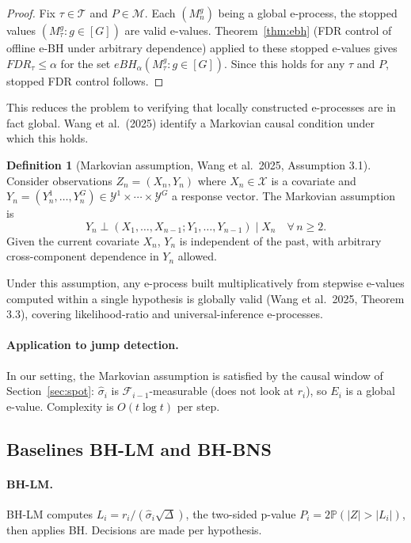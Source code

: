 \documentclass[11pt,a4paper,twocolumn]{article}
\theoremstyle{plain}
\theoremstyle{definition}
\newtheorem{definition}[theorem]{Definition}
\theoremstyle{remark}
\newcommand{\Prob}{\mathbb{P}}
\newcommand{\dt}{\Delta}
\begin{document}
\begin{proof}
Fix $\tau \in \mathcal{T}$ and $P \in \mathcal{M}$. Each $(M_n^g)$ being a
global e-process, the stopped values $(M_\tau^g : g \in [G])$ are valid
e-values. Theorem~\ref{thm:ebh} (FDR control of offline e-BH under arbitrary
dependence) applied to these stopped e-values gives $FDR_\tau \leq \alpha$
for the set $eBH_\alpha(M_\tau^g : g \in [G])$. Since this holds for any
$\tau$ and $P$, stopped FDR control follows.
\end{proof}

This reduces the problem to verifying that locally constructed e-processes
are in fact global. Wang et al.\ (2025) identify a Markovian causal
condition under which this holds.

\begin{definition}[Markovian assumption, Wang et al.\ 2025, Assumption 3.1]
Consider observations $Z_n = (X_n, Y_n)$ where $X_n \in \mathcal{X}$ is a
covariate and $Y_n = (Y_n^1, \ldots, Y_n^G) \in \mathcal{Y}^1 \times \cdots
\times \mathcal{Y}^G$ a response vector. The Markovian assumption is
\[
  Y_n \perp (X_1,\ldots,X_{n-1};Y_1,\ldots,Y_{n-1}) \mid X_n
  \quad \forall\, n \geq 2.
\]
Given the current covariate $X_n$, $Y_n$ is independent of the past, with
arbitrary cross-component dependence in $Y_n$ allowed.
\end{definition}

Under this assumption, any e-process built multiplicatively from stepwise
e-values computed within a single hypothesis is globally valid (Wang et
al.\ 2025, Theorem 3.3), covering likelihood-ratio and universal-inference
e-processes.

\paragraph{Application to jump detection.}
In our setting, the Markovian assumption is satisfied by the causal window
of Section~\ref{sec:spot}: $\hat{\sigma}_i$ is $\mathcal{F}_{i-1}$-measurable
(does not look at $r_i$), so $E_i$ is a global e-value. Complexity is
$O(t \log t)$ per step.

\subsection{Baselines BH-LM and BH-BNS}

\paragraph{BH-LM.}
BH-LM computes $L_i = r_i / (\hat{\sigma}_i\sqrt{\dt})$, the two-sided
p-value $P_i = 2\Prob(|Z| > |L_i|)$, then applies BH. Decisions are made
per hypothesis.
\end{document}
